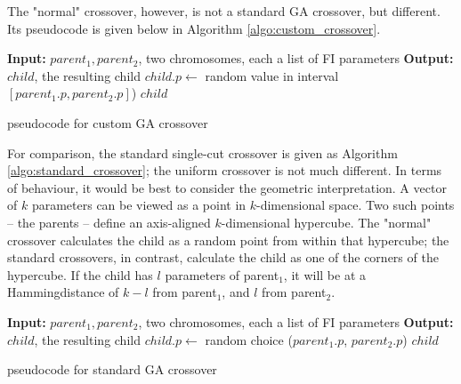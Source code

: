 \documentclass[times, utf8, diplomski]{fer}
\begin{document}
The "normal" crossover, however, is not a standard GA crossover, but different.
Its pseudocode is given below in Algorithm \ref{algo:custom_crossover}.

\begin{algorithm}
    \small
    \begin{algorithmic}
        \STATE \textbf{Input:} $parent_1, parent_2$, two chromosomes, each a list of FI parameters
        \STATE \textbf{Output:} $child$, the resulting child
            \STATE $child.p \gets $ random value in interval $[parent_1.p, parent_2.p]$)
        \ENDFOR
        \RETURN $child$
    \end{algorithmic}
    \caption{pseudocode for custom GA crossover}
    \label{algo:custom_crossover}
\end{algorithm}

For comparison, the standard single-cut crossover is given as Algorithm
\ref{algo:standard_crossover}; the uniform crossover is not much different.
In terms of behaviour, it would be best to consider the geometric interpretation.
A vector of $k$ parameters can be viewed as a point in $k$-dimensional space.
Two such points -- the parents -- define an axis-aligned $k$-dimensional hypercube.
The "normal" crossover calculates the child as a random point from within
that hypercube; the standard crossovers, in contrast, calculate the child as
one of the corners of the hypercube. If the child has $l$ parameters of parent$_1$,
it will be at a Hamming\footnotemark distance of $k-l$ from parent$_1$, and $l$
from parent$_2$.



\begin{algorithm}
    \small
    \begin{algorithmic}
        \STATE \textbf{Input:} $parent_1, parent_2$, two chromosomes, each a list of FI parameters
        \STATE \textbf{Output:} $child$, the resulting child
            \STATE $child.p \gets $ random choice ($parent_1.p$, $parent_2.p$)
        \ENDFOR
        \RETURN $child$
    \end{algorithmic}
    \caption{pseudocode for standard GA crossover}
    \label{algo:standard_crossover}
\end{algorithm}
\end{document}
